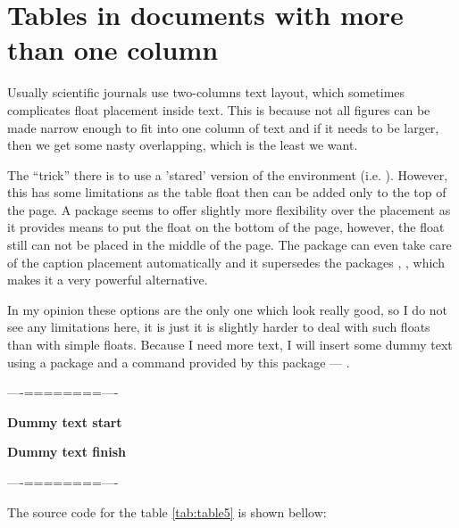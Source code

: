 \documentclass[
]{scrartcl}
\begin{document}



\section{Tables in documents with more than one column}

\begin{multicols}{2}
    

    Usually scientific journals use two-columns text layout, which sometimes
        complicates float placement inside text. 
    This is because not all figures can be made narrow enough to fit into one
        column of text and if it needs to be larger, then we get some nasty
        overlapping, which is the least we want.

    The ``trick'' there is to use a 'stared' version of the 
        environment (i.e. ). 
    However, this has some limitations as the table float then can be added only
        to the top of the page. 
    A package  seems to offer slightly more flexibility over the
        placement as it provides means to put the float on the bottom of the
        page, however, the float still can not be placed in the middle of the
        page.
    The package  can even take care of the caption placement
        automatically and it supersedes the packages ,
        , which makes it a very powerful alternative.

    In my opinion these options are the only one which look really good, so I do
        not see any limitations here, it is just it is slightly harder to deal
        with such floats than with simple floats.
    Because I need more text, I will insert some dummy text using a package
         and a command provided by this package ---
        .

    ----========----

    \textbf{Dummy text start}

    \blindtext

    \blindtext

    \blindtext

    \blindtext

    \blindtext

    \textbf{Dummy text finish}

    ----========----
\end{multicols}

%
The source code for the table \ref{tab:table5} is shown bellow:
    
\end{document}
